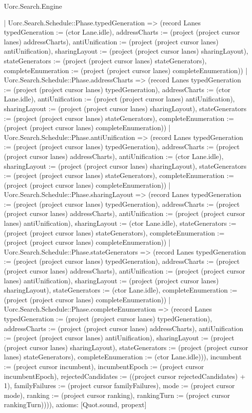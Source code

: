 \begin{lexlean}{Uorc.Search.Engine}
\begin{semanticmodule}
{{      | Uorc.Search.Schedule::Phase.typedGeneration => (record Lanes {typedGeneration := (ctor Lane.idle), addressCharts := (project (project cursor lanes) addressCharts), antiUnification := (project (project cursor lanes) antiUnification), sharingLayout := (project (project cursor lanes) sharingLayout), stateGenerators := (project (project cursor lanes) stateGenerators), completeEnumeration := (project (project cursor lanes) completeEnumeration)})
      | Uorc.Search.Schedule::Phase.addressCharts => (record Lanes {typedGeneration := (project (project cursor lanes) typedGeneration), addressCharts := (ctor Lane.idle), antiUnification := (project (project cursor lanes) antiUnification), sharingLayout := (project (project cursor lanes) sharingLayout), stateGenerators := (project (project cursor lanes) stateGenerators), completeEnumeration := (project (project cursor lanes) completeEnumeration)})
      | Uorc.Search.Schedule::Phase.antiUnification => (record Lanes {typedGeneration := (project (project cursor lanes) typedGeneration), addressCharts := (project (project cursor lanes) addressCharts), antiUnification := (ctor Lane.idle), sharingLayout := (project (project cursor lanes) sharingLayout), stateGenerators := (project (project cursor lanes) stateGenerators), completeEnumeration := (project (project cursor lanes) completeEnumeration)})
      | Uorc.Search.Schedule::Phase.sharingLayout => (record Lanes {typedGeneration := (project (project cursor lanes) typedGeneration), addressCharts := (project (project cursor lanes) addressCharts), antiUnification := (project (project cursor lanes) antiUnification), sharingLayout := (ctor Lane.idle), stateGenerators := (project (project cursor lanes) stateGenerators), completeEnumeration := (project (project cursor lanes) completeEnumeration)})
      | Uorc.Search.Schedule::Phase.stateGenerators => (record Lanes {typedGeneration := (project (project cursor lanes) typedGeneration), addressCharts := (project (project cursor lanes) addressCharts), antiUnification := (project (project cursor lanes) antiUnification), sharingLayout := (project (project cursor lanes) sharingLayout), stateGenerators := (ctor Lane.idle), completeEnumeration := (project (project cursor lanes) completeEnumeration)})
      | Uorc.Search.Schedule::Phase.completeEnumeration => (record Lanes {typedGeneration := (project (project cursor lanes) typedGeneration), addressCharts := (project (project cursor lanes) addressCharts), antiUnification := (project (project cursor lanes) antiUnification), sharingLayout := (project (project cursor lanes) sharingLayout), stateGenerators := (project (project cursor lanes) stateGenerators), completeEnumeration := (ctor Lane.idle)})), incumbent := (project cursor incumbent), incumbentEpoch := (project cursor incumbentEpoch), rejectedCandidates := ((project cursor rejectedCandidates) + 1), familyFailures := (project cursor familyFailures), mode := (project cursor mode), ranking := (project cursor ranking), rankingTurn := (project cursor rankingTurn)}))),
  axioms: [Quot.sound, propext]
}


\end{semanticmodule}
\end{lexlean}

